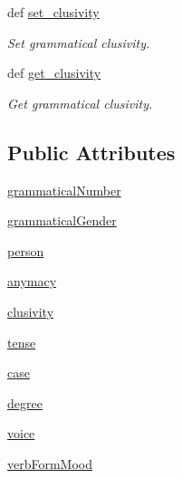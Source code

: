 \begin{DoxyCompactItemize}
def \hyperlink{classlmf_1_1src_1_1morphology_1_1word__form_1_1_word_form_a711b4b9fb46e15d8d64c831dd3c73f15}{set\+\_\+clusivity}
\begin{DoxyCompactList}\small\item\em Set grammatical clusivity. \end{DoxyCompactList}\item 
def \hyperlink{classlmf_1_1src_1_1morphology_1_1word__form_1_1_word_form_af7009607358c6be4f37b7708193eb2e7}{get\+\_\+clusivity}
\begin{DoxyCompactList}\small\item\em Get grammatical clusivity. \end{DoxyCompactList}\end{DoxyCompactItemize}
\subsection*{Public Attributes}
\begin{DoxyCompactItemize}
\item 
\hyperlink{classlmf_1_1src_1_1morphology_1_1word__form_1_1_word_form_afa022505f197952b8cf9229e065089c2}{grammatical\+Number}
\item 
\hyperlink{classlmf_1_1src_1_1morphology_1_1word__form_1_1_word_form_ab6f9abda4baef6ac9e61ef377c532279}{grammatical\+Gender}
\item 
\hyperlink{classlmf_1_1src_1_1morphology_1_1word__form_1_1_word_form_a982fc33af45a08aa5a039dc4701c3689}{person}
\item 
\hyperlink{classlmf_1_1src_1_1morphology_1_1word__form_1_1_word_form_aaf6096a08af3e92ad3878b68d2e136d3}{anymacy}
\item 
\hyperlink{classlmf_1_1src_1_1morphology_1_1word__form_1_1_word_form_aafbd3d5422083422a4a9ee9b1379913e}{clusivity}
\item 
\hyperlink{classlmf_1_1src_1_1morphology_1_1word__form_1_1_word_form_aaf6dd6658e2e9014ea0490d0edb6cec8}{tense}
\item 
\hyperlink{classlmf_1_1src_1_1morphology_1_1word__form_1_1_word_form_ac996cb6a252a2e97aea0ba861982a640}{case}
\item 
\hyperlink{classlmf_1_1src_1_1morphology_1_1word__form_1_1_word_form_ae529bc2d6ef927ccb6da6599901dccb2}{degree}
\item 
\hyperlink{classlmf_1_1src_1_1morphology_1_1word__form_1_1_word_form_ac08b72f6837815d9d11d3cb0a36ed932}{voice}
\item 
\hyperlink{classlmf_1_1src_1_1morphology_1_1word__form_1_1_word_form_a47aea97a4bbd8cca9624b0143f639716}{verb\+Form\+Mood}
\end{DoxyCompactItemize}


